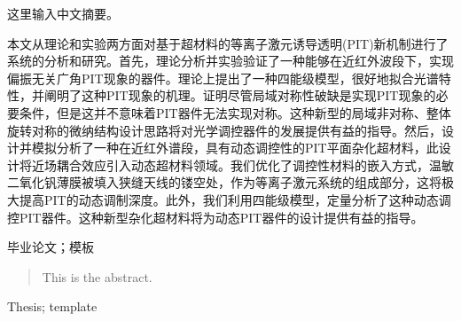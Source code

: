 

\begin{zhaiyao}
这里输入中文摘要。

本文从理论和实验两方面对基于超材料的等离子激元诱导透明(PIT)新机制进行了系统的分析和研究。首先，理论分析并实验验证了一种能够在近红外波段下，实现偏振无关广角PIT现象的器件。理论上提出了一种四能级模型，很好地拟合光谱特性，并阐明了这种PIT现象的机理。证明尽管局域对称性破缺是实现PIT现象的必要条件，但是这并不意味着PIT器件无法实现对称。这种新型的局域非对称、整体旋转对称的微纳结构设计思路将对光学调控器件的发展提供有益的指导。然后，设计并模拟分析了一种在近红外谱段，具有动态调控性的PIT平面杂化超材料，此设计将近场耦合效应引入动态超材料领域。我们优化了调控性材料的嵌入方式，温敏二氧化钒薄膜被填入狭缝天线的镂空处，作为等离子激元系统的组成部分，这将极大提高PIT的动态调制深度。此外，我们利用四能级模型，定量分析了这种动态调控PIT器件。这种新型杂化超材料将为动态PIT器件的设计提供有益的指导。
\end{zhaiyao}




\begin{guanjianci}
毕业论文；模板
\end{guanjianci}



\begin{abstract}
This is the abstract.
\end{abstract}



\begin{keywords}
Thesis; template
\end{keywords} 